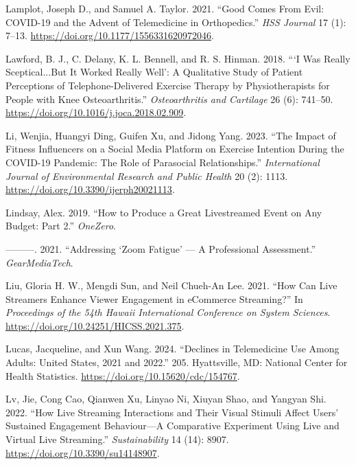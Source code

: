 \documentclass[
  letterpaper,
  DIV=11,
  numbers=noendperiod,
  oneside]{scrartcl}
\newlength{\cslhangindent}
\newenvironment{CSLReferences}[2] %
 {\begin{list}{}{%
  \setlength{\itemindent}{0pt}
  \setlength{\leftmargin}{0pt}
  \setlength{\parsep}{0pt}
  \ifodd #1
   \setlength{\leftmargin}{\cslhangindent}
   \setlength{\itemindent}{-1\cslhangindent}
  \fi
  \setlength{\itemsep}{#2\baselineskip}}}
 {\end{list}}
\begin{document}
\begin{CSLReferences}{1}{0}
Lamplot, Joseph D., and Samuel A. Taylor. 2021. {``Good {Comes From
Evil}: {COVID-19} and the {Advent} of {Telemedicine} in
{Orthopedics}.''} \emph{HSS Journal{\textregistered}} 17 (1): 7--13.
\url{https://doi.org/10.1177/1556331620972046}.

Lawford, B. J., C. Delany, K. L. Bennell, and R. S. Hinman. 2018.
{``{`{I} Was Really Sceptical...{But} It Worked Really Well'}: A
Qualitative Study of Patient Perceptions of Telephone-Delivered Exercise
Therapy by Physiotherapists for People with Knee Osteoarthritis.''}
\emph{Osteoarthritis and Cartilage} 26 (6): 741--50.
\url{https://doi.org/10.1016/j.joca.2018.02.909}.

Li, Wenjia, Huangyi Ding, Guifen Xu, and Jidong Yang. 2023. {``The
{Impact} of {Fitness Influencers} on a {Social Media Platform} on
{Exercise Intention} During the {COVID-19 Pandemic}: {The Role} of
{Parasocial Relationships}.''} \emph{International Journal of
Environmental Research and Public Health} 20 (2): 1113.
\url{https://doi.org/10.3390/ijerph20021113}.

Lindsay, Alex. 2019. {``How to {Produce} a {Great Livestreamed Event} on
{Any Budget}: {Part} 2.''} \emph{OneZero}.

---------. 2021. {``Addressing {`{Zoom Fatigue}'} --- {A Professional
Assessment}.''} \emph{GearMediaTech}.

Liu, Gloria H. W., Mengdi Sun, and Neil Chueh-An Lee. 2021. {``How Can
Live Streamers Enhance Viewer Engagement in {eCommerce} Streaming?''} In
\emph{Proceedings of the 54th {Hawaii International Conference} on
{System Sciences}}. \url{https://doi.org/10.24251/HICSS.2021.375}.

Lucas, Jacqueline, and Xun Wang. 2024. {``Declines in Telemedicine Use
Among Adults: {United States}, 2021 and 2022.''} 205. Hyattsville, MD:
National Center for Health Statistics.
\url{https://doi.org/10.15620/cdc/154767}.

Lv, Jie, Cong Cao, Qianwen Xu, Linyao Ni, Xiuyan Shao, and Yangyan Shi.
2022. {``How {Live Streaming Interactions} and {Their Visual Stimuli
Affect Users}' {Sustained Engagement Behaviour}---{A Comparative
Experiment Using Live} and {Virtual Live Streaming}.''}
\emph{Sustainability} 14 (14): 8907.
\url{https://doi.org/10.3390/su14148907}.


\end{CSLReferences}
\end{document}
